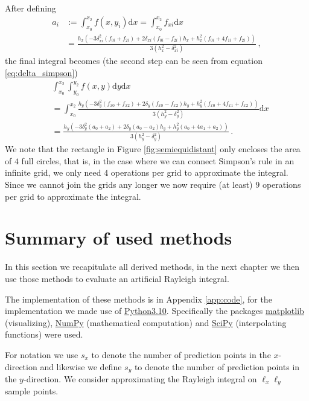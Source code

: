 After defining
\begin{align}
    a_i &:=\int_{x_0}^{x_2} f(x, y_i) \mathrm dx = \int_{x_0}^{x_2} f_{xi} \mathrm d x \nonumber \\
    &= \frac{h_{x}(-3\delta_{xi}^2(f_{0i}+f_{2i}) + 2\delta_{xi}(f_{0i}-f_{2i})h_{x} + h_{x}^2 (f_{0i}+4f_{1i}+f_{2i}))}{3 (h_{x}^2-\delta_{xi}^2)} \,, \nonumber
\end{align}
the final integral becomes (the second step can be seen from equation \ref{eq:delta_simpson})
\begin{align}
    &\int_{x_0}^{x_2} \int_{y_0}^{y_2} f(x, y) \mathrm d y \mathrm dx \nonumber \\
    &= \int_{x_0}^{x_2} \frac{h_y(-3\delta_y^2(f_{x0}+f_{x2}) + 2\delta_y(f_{x0}-f_{x2})h_y + h_y^2 (f_{x0}+4f_{x1}+f_{x2}))}{3 (h_y^2-\delta_y^2)} \mathrm dx \nonumber \\
    &= \frac{h_y(-3\delta_y^2(a_0+a_2) + 2\delta_y(a_0-a_2)h_y + h_y^2 (a_0+4a_1+a_2))}{3 (h_y^2-\delta_y^2)} \,.\nonumber
\end{align}
We note that the rectangle in Figure \ref{fig:semiequidistant} only encloses the area of $4$ full circles, that is, in the case where we can connect Simpson's rule in an infinite grid, we only need $4$ operations per grid to approximate the integral.
Since we cannot join the grids any longer we now require (at least) $9$ operations per grid to approximate the integral.

\section{Summary of used methods}
\label{summary_used_method}
In this section we recapitulate all derived methods, in the next chapter we then use those methods to evaluate an artificial Rayleigh integral.

The implementation of these methods is in Appendix \ref{app:code}, for the implementation we made use of \href{https://www.python.org/downloads/release/python-3100/}{Python3.10}.
Specifically the packages \href{https://matplotlib.org/}{matplotlib} (visualizing), \href{https://numpy.org/}{NumPy} (mathematical computation) and \href{https://scipy.org/}{SciPy} (interpolating functions) were used.

For notation we use $s_x$ to denote the number of prediction points in the $x$-direction and likewise we define $s_y$ to denote the number of prediction points in the $y$-direction.
We consider approximating the Rayleigh integral on $\ell_x \ell_y$ sample points.

